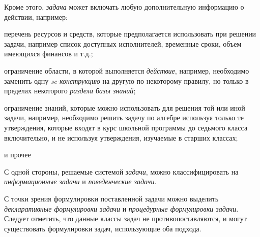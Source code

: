 \begin{SCn}
{	Кроме этого, \textit{задача} может включать любую дополнительную информацию о действии, например:
	\begin{scnitemize}
		\item перечень ресурсов и средств, которые предполагается использовать при решении задачи, например список доступных исполнителей, временные сроки, объем имеющихся финансов и т.д.;
		\item ограничение области, в которой выполняется \textit{действие}, например, необходимо заменить одну \textit{sc-конструкцию} на другую по некоторому правилу, но только в пределах некоторого \textit{раздела базы знаний};
		\item ограничение знаний, которые можно использовать для решения той или иной задачи, например, необходимо решить задачу по алгебре используя только те утверждения, которые входят в курс школьной программы до седьмого класса включительно, и не используя утверждения, изучаемые в старших классах;
		\item и прочее
	\end{scnitemize}
	С одной стороны, решаемые системой \textit{задачи}, можно классифицировать на \textit{информационные задачи} и \textit{поведенческие задачи}.
	
	С точки зрения формулировки поставленной задачи можно выделить \textit{декларативные формулировки задачи} и \textit{процедурные формулировки задачи}. Следует отметить, что данные классы задач не противопоставляются, и могут существовать формулировки задач, использующие оба подхода.}


\end{SCn}
